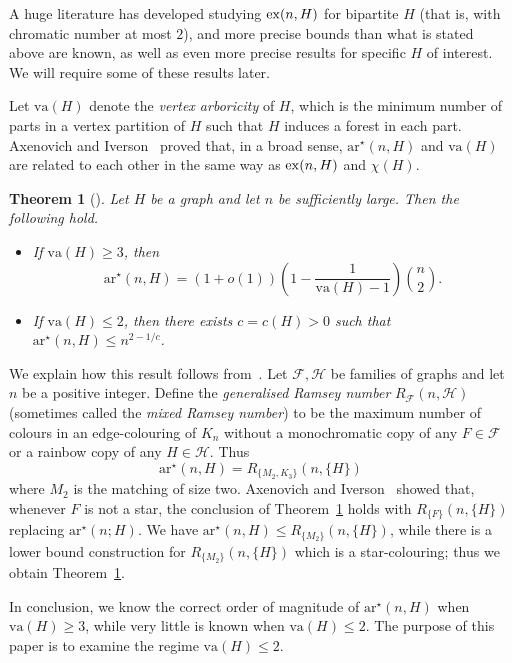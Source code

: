 \documentclass[a4paper, 12pt]{article}
\numberwithin{equation}{section}
\newtheorem{theorem}{Theorem}[section]
\def\sar{{\mathrm{ar}^{\star}}}
\def\va{{\mathrm{va}}}
\newcommand{\mc}[1]{\mathcal{#1}}
\begin{document}
A huge literature has developed studying ${\rm ex}(n,H)$ for bipartite $H$ (that is, with chromatic number at most $2$), and more precise bounds than what is stated above are known, as well as even more precise results for specific $H$ of interest. We will require some of these results later.






Let $\va(H)$ denote the \emph{vertex arboricity} of $H$, which is the minimum number of parts in a vertex partition of $H$ such that $H$ induces a forest in each part.
Axenovich and Iverson~\cite{AxenovichIverson} proved that, in a broad sense, $\sar(n,H)$ and $\va(H)$ are related to each other in the same way as ${\rm ex}(n,H)$ and $\chi(H)$.

\begin{theorem}[\cite{AxenovichIverson}]\label{th:AxenovichIverson}
Let $H$ be a graph and let $n$ be sufficiently large. Then the following hold.
\begin{itemize}
    \item[(i)] If $\va(H) \geq 3$, then
    $$
    \sar(n,H) = (1+o(1))\left(1-\frac{1}{\va(H)-1}\right)\binom{n}{2}.
    $$
    \item[(ii)] If $\va(H) \leq 2$, then there exists $c=c(H)>0$ such that $\sar(n,H) \leq n^{2-1/c}$.
\end{itemize}
\end{theorem}

We explain how this result follows from~\cite{AxenovichIverson}.
Let $\mc{F},\mc{H}$ be families of graphs and let $n$ be a positive integer. Define the \emph{generalised Ramsey number} $R_{\mc{F}}(n,\mc{H})$ 
(sometimes called the \emph{mixed Ramsey number}) to be the maximum number of colours in an edge-colouring of $K_n$ without a monochromatic copy of any $F \in \mc{F}$ or a rainbow copy of any $H \in \mc{H}$.
Thus
$$
\sar(n,H) = R_{\{M_2,K_3\}}(n,\{H\})
$$
where $M_2$ is the matching of size two.
Axenovich and Iverson~\cite{AxenovichIverson} showed that, whenever $F$ is not a star, the conclusion of Theorem~\ref{th:AxenovichIverson} holds with $R_{\{F\}}(n,\{H\})$ replacing $\sar(n;H)$. We have $\sar(n,H) \leq R_{\{M_2\}}(n,\{H\})$, while there is a lower bound construction for $R_{\{M_2\}}(n,\{H\})$ which is a star-colouring; thus we obtain Theorem~\ref{th:AxenovichIverson}.

In conclusion, we know the correct order of magnitude of $\sar(n,H)$ when $\va(H) \geq 3$, while very little is known when $\va(H) \leq 2$.
The purpose of this paper is to examine the regime $\va(H) \leq 2$.
\end{document}
